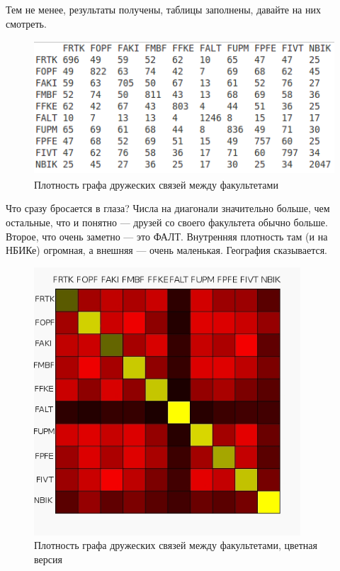 \documentclass{article}
\begin{document}
Тем не менее, результаты получены, таблицы заполнены, давайте на них смотреть.

\newpage

\begin{figure}[h]
\begin{center}
    \includegraphics[height=5cm]{friendship_txt.png}
    \caption{Плотность графа дружеских связей между факультетами}
\end{center}
\end{figure}

Что сразу бросается в глаза? Числа на диагонали значительно больше, чем остальные, что и понятно --- друзей со своего факультета обычно
больше. Второе, что очень заметно --- это ФАЛТ. Внутренняя плотность там (и на НБИКе) огромная, а внешняя --- очень маленькая. География
сказывается.

\begin{figure}[h]
\begin{center}
    \includegraphics[height=10cm]{friendship_color.png}
    \caption{Плотность графа дружеских связей между факультетами, цветная версия}
\end{center}
\end{figure}
\end{document}
